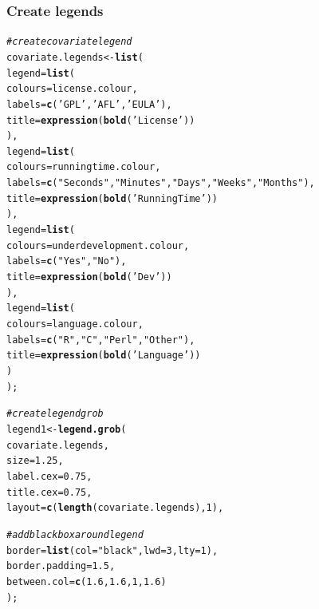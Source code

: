 \documentclass[letterpaper]{article}\usepackage[]{graphicx}\usepackage[]{color}
\makeatletter
\newcommand{\hlnum}[1]{\textcolor[rgb]{0.686,0.059,0.569}{#1}}%
\newcommand{\hlstr}[1]{\textcolor[rgb]{0.192,0.494,0.8}{#1}}%
\newcommand{\hlcom}[1]{\textcolor[rgb]{0.678,0.584,0.686}{\textit{#1}}}%
\newcommand{\hlstd}[1]{\textcolor[rgb]{0.345,0.345,0.345}{#1}}%
\newcommand{\hlkwb}[1]{\textcolor[rgb]{0.69,0.353,0.396}{#1}}%
\newcommand{\hlkwc}[1]{\textcolor[rgb]{0.333,0.667,0.333}{#1}}%
\newcommand{\hlkwd}[1]{\textcolor[rgb]{0.737,0.353,0.396}{\textbf{#1}}}%
\newenvironment{kframe}{%
 \def\at@end@of@kframe{}%
 \ifinner\ifhmode%
  \def\at@end@of@kframe{\end{minipage}}%
  \begin{minipage}{\columnwidth}%
 \fi\fi%
 \def\FrameCommand##1{\hskip\@totalleftmargin \hskip-\fboxsep
 \colorbox{shadecolor}{##1}\hskip-\fboxsep
     \hskip-\linewidth \hskip-\@totalleftmargin \hskip\columnwidth}%
 \MakeFramed {\advance\hsize-\width
   \@totalleftmargin\z@ \linewidth\hsize
   \@setminipage}}%
 {\par\unskip\endMakeFramed%
 \at@end@of@kframe}
\newenvironment{knitrout}{}{} %
\makeatother
\begin{document}
\subsubsection{Create legends}
\begin{knitrout}
\color{fgcolor}\begin{kframe}
\begin{alltt}
\hlcom{# create covariate legend}
\hlstd{covariate.legends} \hlkwb{<-} \hlkwd{list}\hlstd{(}
    \hlkwc{legend} \hlstd{=} \hlkwd{list}\hlstd{(}
        \hlkwc{colours} \hlstd{= license.colour,}
        \hlkwc{labels}  \hlstd{=} \hlkwd{c}\hlstd{(}\hlstr{'GPL'}\hlstd{,} \hlstr{'AFL'}\hlstd{,} \hlstr{'EULA'}\hlstd{),}
        \hlkwc{title}   \hlstd{=} \hlkwd{expression}\hlstd{(}\hlkwd{bold}\hlstd{(}\hlstr{'License'}\hlstd{))}
        \hlstd{),}
    \hlkwc{legend} \hlstd{=} \hlkwd{list}\hlstd{(}
        \hlkwc{colours} \hlstd{= runningtime.colour,}
        \hlkwc{labels}  \hlstd{=} \hlkwd{c}\hlstd{(}\hlstr{"Seconds"}\hlstd{,} \hlstr{"Minutes"}\hlstd{,} \hlstr{"Days"}\hlstd{,} \hlstr{"Weeks"}\hlstd{,} \hlstr{"Months"}\hlstd{),}
        \hlkwc{title}   \hlstd{=} \hlkwd{expression}\hlstd{(}\hlkwd{bold}\hlstd{(}\hlstr{'Running Time'}\hlstd{))}
        \hlstd{),}
    \hlkwc{legend} \hlstd{=} \hlkwd{list}\hlstd{(}
        \hlkwc{colours} \hlstd{= underdevelopment.colour,}
        \hlkwc{labels}  \hlstd{=} \hlkwd{c}\hlstd{(}\hlstr{"Yes"}\hlstd{,} \hlstr{"No"}\hlstd{),}
        \hlkwc{title}   \hlstd{=} \hlkwd{expression}\hlstd{(}\hlkwd{bold}\hlstd{(}\hlstr{'Dev'}\hlstd{))}
        \hlstd{),}
    \hlkwc{legend} \hlstd{=} \hlkwd{list}\hlstd{(}
        \hlkwc{colours} \hlstd{= language.colour,}
        \hlkwc{labels}  \hlstd{=} \hlkwd{c}\hlstd{(}\hlstr{"R"}\hlstd{,} \hlstr{"C"}\hlstd{,} \hlstr{"Perl"}\hlstd{,} \hlstr{"Other"}\hlstd{),}
        \hlkwc{title}   \hlstd{=} \hlkwd{expression}\hlstd{(}\hlkwd{bold}\hlstd{(}\hlstr{'Language'}\hlstd{))}
        \hlstd{)}
    \hlstd{);}

\hlcom{# create legend grob}
\hlstd{legend1} \hlkwb{<-} \hlkwd{legend.grob}\hlstd{(}
    \hlstd{covariate.legends,}
    \hlkwc{size} \hlstd{=} \hlnum{1.25}\hlstd{,}
    \hlkwc{label.cex} \hlstd{=} \hlnum{0.75}\hlstd{,}
    \hlkwc{title.cex} \hlstd{=} \hlnum{0.75}\hlstd{,}
    \hlkwc{layout} \hlstd{=} \hlkwd{c}\hlstd{(}\hlkwd{length}\hlstd{(covariate.legends),} \hlnum{1}\hlstd{),}

    \hlcom{# add black box around legend}
    \hlkwc{border} \hlstd{=} \hlkwd{list}\hlstd{(}\hlkwc{col} \hlstd{=} \hlstr{"black"}\hlstd{,} \hlkwc{lwd} \hlstd{=} \hlnum{3}\hlstd{,} \hlkwc{lty} \hlstd{=} \hlnum{1}\hlstd{),}
    \hlkwc{border.padding} \hlstd{=} \hlnum{1.5}\hlstd{,}
    \hlkwc{between.col} \hlstd{=} \hlkwd{c}\hlstd{(}\hlnum{1.6}\hlstd{,} \hlnum{1.6}\hlstd{,} \hlnum{1}\hlstd{,} \hlnum{1.6}\hlstd{)}
    \hlstd{);}



\end{alltt}
\end{kframe}
\end{knitrout}
\end{document}
